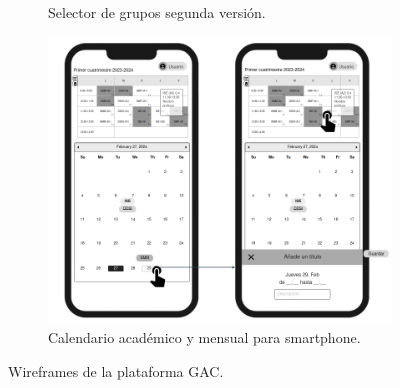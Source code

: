 \begin{figure}[!tb]
\begin{subfigure}[b]{0.35\textwidth}
        \caption{Selector de grupos segunda versión.}
    \end{subfigure}
    \begin{subfigure}[b]{0.35\textwidth}
        \includegraphics[width=\textwidth]{./imagenes/Mockups_smartphone2.png}
        \caption{Calendario académico y mensual para smartphone.}
    \end{subfigure}
    \caption{Wireframes de la plataforma GAC.}
\end{figure}
